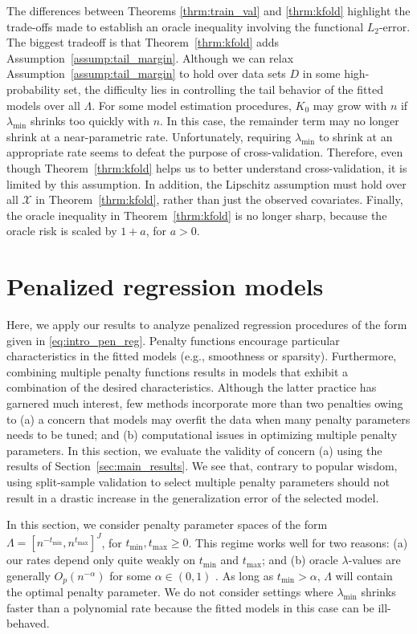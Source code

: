 \documentclass[12pt]{article} %
\theoremstyle{definition}
\begin{document}
The differences between Theorems \ref{thrm:train_val} and \ref{thrm:kfold} highlight the trade-offs made to establish an oracle inequality involving the functional $L_2$-error.
The biggest tradeoff is that Theorem~\ref{thrm:kfold} adds Assumption~\ref{assump:tail_margin}.
Although we can relax Assumption~\ref{assump:tail_margin} to hold over data sets $D$ in some high-probability set, the difficulty lies in controlling the tail behavior of the fitted models over all $\Lambda$.
For some model estimation procedures, $K_0$ may grow with $n$ if $\lambda_{\min}$ shrinks too quickly with $n$.
In this case, the remainder term may no longer shrink at a near-parametric rate.
Unfortunately, requiring $\lambda_{\min}$ to shrink at an appropriate rate seems to defeat the purpose of cross-validation.
Therefore, even though Theorem~\ref{thrm:kfold} helps us to better understand cross-validation, it is limited by this assumption.
In addition, the Lipschitz assumption must hold over all $\mathcal{X}$ in Theorem~\ref{thrm:kfold}, rather than just the observed covariates.
Finally, the oracle inequality in Theorem~\ref{thrm:kfold} is no longer sharp, because the oracle risk is scaled by $1+a$, for $a > 0$.

\section{Penalized regression models}
\label{sec:examples}
Here, we apply our results to analyze penalized regression procedures of the form given in \eqref{eq:intro_pen_reg}.
Penalty functions encourage particular characteristics in the fitted models (e.g., smoothness or sparsity).
Furthermore, combining multiple penalty functions results in models that exhibit a combination of the desired characteristics.
Although the latter practice has garnered much interest, few methods incorporate more than two penalties owing to (a) a concern that models may overfit the data when many penalty parameters needs to be tuned; and (b) computational issues in optimizing multiple penalty parameters. In this section, we evaluate the validity of concern (a) using the results of Section~\ref{sec:main_results}. We see that, contrary to popular wisdom, using split-sample validation to select multiple penalty parameters should not result in a drastic increase in the generalization error of the selected model.

In this section, we consider penalty parameter spaces of the form
$\Lambda = [ n^{-t_{\min}}, n^{t_{\max}}]^J$, for $t_{\min}, t_{\max} \ge 0$.
This regime works well for two reasons: (a) our rates depend only quite weakly on $t_{\min}$ and $t_{\max}$; and (b) oracle $\lambda$-values are generally $O_p(n^{-\alpha})$ for some $\alpha \in (0,1)$ \citep{van2000empirical, van2015penalized, buhlmann2011statistics}.
As long as $t_{\min} > \alpha$, $\Lambda$ will contain the optimal penalty parameter.
We do not consider settings where $\lambda_{\min}$ shrinks faster than a polynomial rate because the fitted models in this case can be ill-behaved.
\end{document}
